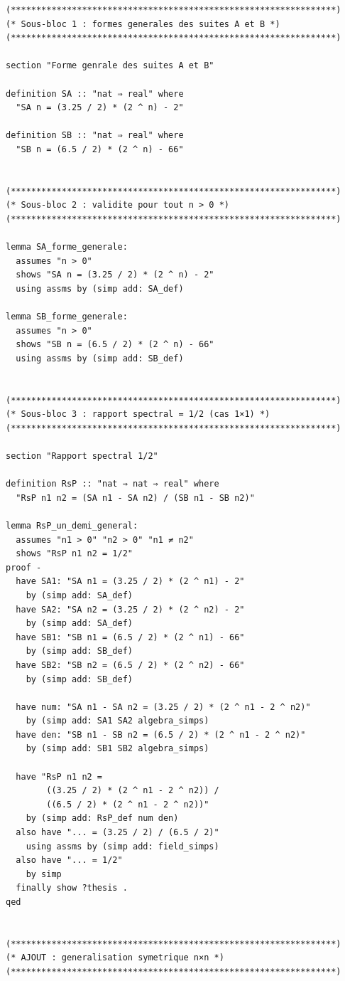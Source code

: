 \documentclass[a4paper,11pt]{article}
\begin{document}
\begin{holcode}[title={\textcolor{white}{File: methode\_spectral.thy -- Part 1/4}}]
\begin{lstlisting}
(****************************************************************)
(* Sous-bloc 1 : formes generales des suites A et B *)
(****************************************************************)

section "Forme genrale des suites A et B"

definition SA :: "nat ⇒ real" where
  "SA n = (3.25 / 2) * (2 ^ n) - 2"

definition SB :: "nat ⇒ real" where
  "SB n = (6.5 / 2) * (2 ^ n) - 66"


(****************************************************************)
(* Sous-bloc 2 : validite pour tout n > 0 *)
(****************************************************************)

lemma SA_forme_generale:
  assumes "n > 0"
  shows "SA n = (3.25 / 2) * (2 ^ n) - 2"
  using assms by (simp add: SA_def)

lemma SB_forme_generale:
  assumes "n > 0"
  shows "SB n = (6.5 / 2) * (2 ^ n) - 66"
  using assms by (simp add: SB_def)


(****************************************************************)
(* Sous-bloc 3 : rapport spectral = 1/2 (cas 1×1) *)
(****************************************************************)

section "Rapport spectral 1/2"

definition RsP :: "nat ⇒ nat ⇒ real" where
  "RsP n1 n2 = (SA n1 - SA n2) / (SB n1 - SB n2)"

lemma RsP_un_demi_general:
  assumes "n1 > 0" "n2 > 0" "n1 ≠ n2"
  shows "RsP n1 n2 = 1/2"
proof -
  have SA1: "SA n1 = (3.25 / 2) * (2 ^ n1) - 2"
    by (simp add: SA_def)
  have SA2: "SA n2 = (3.25 / 2) * (2 ^ n2) - 2"
    by (simp add: SA_def)
  have SB1: "SB n1 = (6.5 / 2) * (2 ^ n1) - 66"
    by (simp add: SB_def)
  have SB2: "SB n2 = (6.5 / 2) * (2 ^ n2) - 66"
    by (simp add: SB_def)

  have num: "SA n1 - SA n2 = (3.25 / 2) * (2 ^ n1 - 2 ^ n2)"
    by (simp add: SA1 SA2 algebra_simps)
  have den: "SB n1 - SB n2 = (6.5 / 2) * (2 ^ n1 - 2 ^ n2)"
    by (simp add: SB1 SB2 algebra_simps)

  have "RsP n1 n2 =
        ((3.25 / 2) * (2 ^ n1 - 2 ^ n2)) /
        ((6.5 / 2) * (2 ^ n1 - 2 ^ n2))"
    by (simp add: RsP_def num den)
  also have "... = (3.25 / 2) / (6.5 / 2)"
    using assms by (simp add: field_simps)
  also have "... = 1/2"
    by simp
  finally show ?thesis .
qed


(****************************************************************)
(* AJOUT : generalisation symetrique n×n *)
(****************************************************************)


\end{lstlisting}
\end{holcode}
\end{document}
